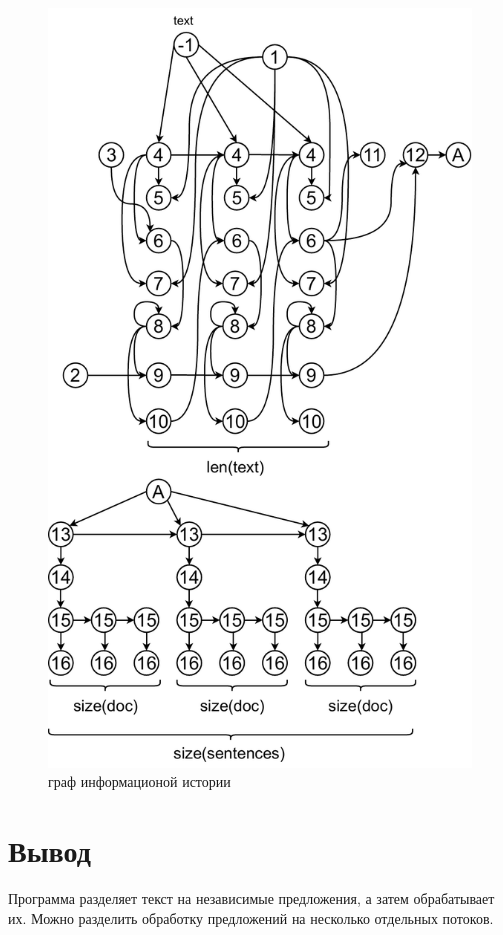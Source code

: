 \begin{figure}[h!]
	\centering
	\includegraphics[width=0.8\linewidth]{img/ii}
	\caption{граф информационой истории}
	\label{fig:inf_his}
\end{figure}
\clearpage

\section*{Вывод}

Программа разделяет текст на независимые предложения, а затем обрабатывает их.
Можно разделить обработку предложений на несколько отдельных потоков.